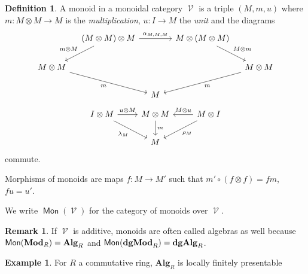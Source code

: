\documentclass[a4paper,11pt,oneside,openany]{scrbook}
\newcommand{\catname}[1]{{\normalfont\textbf{#1}}}
\newcommand{\Mod}{\catname{Mod}}
\newcommand{\dgMod}{\catname{dgMod}}
\DeclareMathOperator{\V}{\mathcal{V}}
\DeclareMathOperator{\Mon}{\mathsf{Mon}}
\theoremstyle{definition}
\theoremstyle{definition}
\newtheorem{defn}[thm]{Definition} %
\newtheorem{rmk}[thm]{Remark}
\newtheorem{exmp}[thm]{Example}
\begin{document}
\begin{defn}
    A monoid in a monoidal category $\V$ is a triple $(M,m,u)$ where $m\colon M\otimes M\rightarrow M$ is the \emph{multiplication}, $u\colon I\rightarrow M$ the \emph{unit} and the diagrams
    \[
    \begin{tikzcd}[column sep=1.0em]
        & (M\otimes M)\otimes M\ar[rr, "\alpha_{M,M,M}"]\ar[dl, "m\otimes M", swap]
        && M\otimes (M\otimes M)\ar[dr, "M\otimes m"] \\
        M\otimes M\ar[drr, "m", swap]
        &&&& M\otimes M\ar[dll, "m"] \\
        && M
    \end{tikzcd}
    \]
    \[
    \begin{tikzcd}
        I\otimes M\ar[r, "u\otimes M"]\ar[dr, "\lambda_M", swap]
        & M\otimes M\ar[d, "m"]
        & M\otimes I\ar[l, "M\otimes u", swap]\ar[dl, "\rho_M"] \\
        & M
    \end{tikzcd}
    \]
    commute.

    Morphisms of monoids are maps $f\colon M\rightarrow M'$ such that $m'\circ (f\otimes f)=fm$, $fu=u'$.

    We write $\Mon(\V)$ for the category of monoids over $\V$.
\end{defn}

\begin{rmk}
    If $\V$ is additive, monoids are often called algebras as well because     $\Mon(\Mod_R)=\mathbf{Alg}_R$ and $\Mon(\dgMod_R)=\mathbf{dgAlg}_R$.
\end{rmk}


\begin{exmp}
    For $ R $ a commutative ring, $ \mathbf{Alg}_R $ is locally finitely presentable
\end{exmp}
\end{document}
